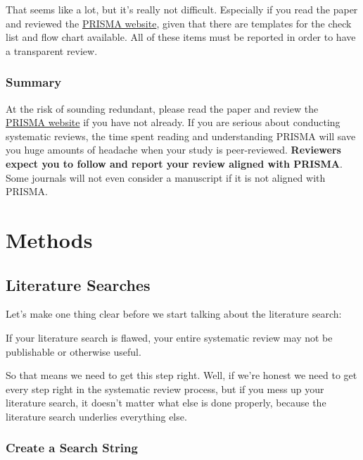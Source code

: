 \documentclass[
]{book}
\begin{document}
That seems like a lot, but it's really not difficult. Especially if you read the paper\citep{page2021} and reviewed the \href{http://www.prisma-statement.org/}{PRISMA website}, given that there are templates for the check list and flow chart available. All of these items must be reported in order to have a transparent review.

\hypertarget{summary}{%
\section{Summary}\label{summary}}

At the risk of sounding redundant, please read the paper\citep{page2021} and review the \href{http://www.prisma-statement.org/}{PRISMA website} if you have not already. If you are serious about conducting systematic reviews, the time spent reading and understanding PRISMA will save you huge amounts of headache when your study is peer-reviewed. \textbf{Reviewers expect you to follow and report your review aligned with PRISMA}. Some journals will not even consider a manuscript if it is not aligned with PRISMA.

\hypertarget{part-methods}{%
\part{Methods}\label{part-methods}}

\hypertarget{literaturesearch}{%
\chapter{Literature Searches}\label{literaturesearch}}

Let's make one thing clear before we start talking about the literature search:

If your literature search is flawed, your entire systematic review may not be publishable or otherwise useful.

So that means we need to get this step right. Well, if we're honest we need to get every step right in the systematic review process, but if you mess up your literature search, it doesn't matter what else is done properly, because the literature search underlies everything else.

\hypertarget{create-a-search-string}{%
\section{Create a Search String}\label{create-a-search-string}}
\end{document}
